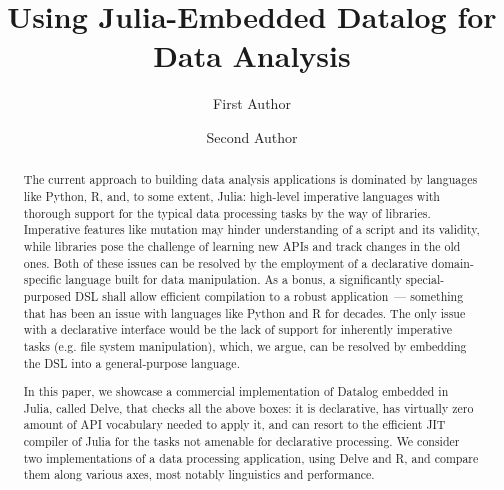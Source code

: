 \documentclass[runningheads]{llncs}
\begin{document}
%
\title{Using Julia-Embedded Datalog for Data Analysis}
%
%
\author{%
First Author%
\and
Second Author%
}
%
%
%
\maketitle              %
%
\begin{abstract}
The current approach to building data analysis applications is
dominated by languages like Python, R, and, to some extent, Julia:
high-level imperative languages with thorough support for the typical
data processing tasks by the way of libraries. Imperative features like
mutation may hinder understanding of a script and its validity, while
libraries pose the challenge of learning new APIs and track changes in
the old ones. Both of these issues can be resolved by the employment of
a declarative domain-specific language built for data manipulation.
As a bonus, a significantly special-purposed DSL shall
allow efficient compilation to a robust application~--- something that
has been an issue with languages like Python and R for decades. The
only issue with a declarative interface would be the lack of support
for inherently imperative tasks (e.g. file system manipulation), which,
we argue, can be resolved by embedding the DSL into a general-purpose
language.

In this paper, we showcase a commercial implementation of Datalog
embedded in Julia, called Delve, that checks all the above boxes: it is declarative,
has virtually zero amount of API vocabulary needed to apply it,
and can resort to the efficient JIT compiler of Julia for the tasks
not amenable for declarative processing. We consider two implementations
of a data processing application, using Delve and R, and compare them
along various axes, most notably linguistics and performance.



\end{abstract}
%
%
%



%
%
%


%
\end{document}
